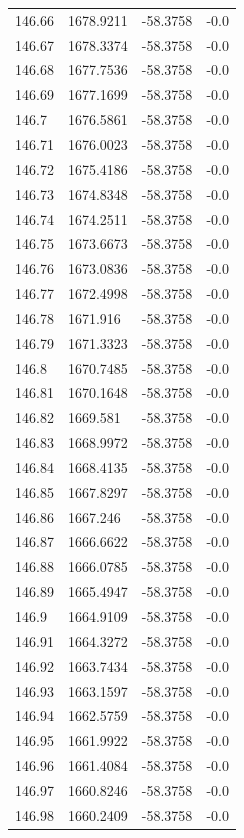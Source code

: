 \begin{table}[H]
\begin{tabular}{llll}
146.66 & 1678.9211 & -58.3758 & -0.0 \\
146.67 & 1678.3374 & -58.3758 & -0.0 \\
146.68 & 1677.7536 & -58.3758 & -0.0 \\
146.69 & 1677.1699 & -58.3758 & -0.0 \\
146.7 & 1676.5861 & -58.3758 & -0.0 \\
146.71 & 1676.0023 & -58.3758 & -0.0 \\
146.72 & 1675.4186 & -58.3758 & -0.0 \\
146.73 & 1674.8348 & -58.3758 & -0.0 \\
146.74 & 1674.2511 & -58.3758 & -0.0 \\
146.75 & 1673.6673 & -58.3758 & -0.0 \\
146.76 & 1673.0836 & -58.3758 & -0.0 \\
146.77 & 1672.4998 & -58.3758 & -0.0 \\
146.78 & 1671.916 & -58.3758 & -0.0 \\
146.79 & 1671.3323 & -58.3758 & -0.0 \\
146.8 & 1670.7485 & -58.3758 & -0.0 \\
146.81 & 1670.1648 & -58.3758 & -0.0 \\
146.82 & 1669.581 & -58.3758 & -0.0 \\
146.83 & 1668.9972 & -58.3758 & -0.0 \\
146.84 & 1668.4135 & -58.3758 & -0.0 \\
146.85 & 1667.8297 & -58.3758 & -0.0 \\
146.86 & 1667.246 & -58.3758 & -0.0 \\
146.87 & 1666.6622 & -58.3758 & -0.0 \\
146.88 & 1666.0785 & -58.3758 & -0.0 \\
146.89 & 1665.4947 & -58.3758 & -0.0 \\
146.9 & 1664.9109 & -58.3758 & -0.0 \\
146.91 & 1664.3272 & -58.3758 & -0.0 \\
146.92 & 1663.7434 & -58.3758 & -0.0 \\
146.93 & 1663.1597 & -58.3758 & -0.0 \\
146.94 & 1662.5759 & -58.3758 & -0.0 \\
146.95 & 1661.9922 & -58.3758 & -0.0 \\
146.96 & 1661.4084 & -58.3758 & -0.0 \\
146.97 & 1660.8246 & -58.3758 & -0.0 \\
146.98 & 1660.2409 & -58.3758 & -0.0 \\

\end{tabular}
\end{table}
